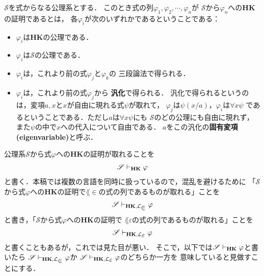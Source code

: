 	\begin{screen}
		\begin{metadfn}[{\bf HK}における証明]
			$\mathscr{S}$を式からなる公理系とする．
			このとき式の列$\varphi_{1},\varphi_{2},\cdots,\varphi_{n}$が
			$\mathscr{S}$から$\varphi_{n}$への{\bf HK}の証明であるとは，
			各$\varphi_{i}$が次のいずれかであるということである：
			\begin{itemize}
				\item $\varphi_{i}$は{\bf HK}の公理である．
				\item $\varphi_{i}$は$\mathscr{S}$の公理である．
				\item $\varphi_{i}$は，これより前の式$\varphi_{j}$と$\varphi_{k}$の
					三段論法で得られる．
				\item $\varphi_{i}$は，これより前の式$\varphi_{j}$から
					{\bf 汎化}で得られる．
					汎化で得られるというのは，変項$a,x$と$x$が自由に現れる式$\psi$が取れて，
					$\varphi_{j}$は$\psi(x/a)$，$\varphi_{i}$は$\forall x \psi$
					であるということである．ただし$a$は$\forall x \psi$にも
					$\mathscr{S}$のどの公理にも自由に現れず，
					また$\psi$の中で$x$への代入について自由である．
					$a$をこの汎化の{\bf 固有変項}
					{\bf (eigenvariable)}と呼ぶ．
			\end{itemize}
		\end{metadfn}
	\end{screen}
	
	公理系$\mathscr{S}$から式$\varphi$への{\bf HK}の証明が取れることを
	\begin{align}
		\mathscr{S} \vdash_{{\scriptsize \mbox{{\bf HK}}}} \varphi
	\end{align}
	と書く．本稿では複数の言語を同時に扱っているので，混乱を避けるために
	「$\mathscr{S}$から式$\varphi$への{\bf HK}の証明で$\lang{\in}$の式の列であるものが取れる」ことを
	\begin{align}
		\mathscr{S} \provable{\mbox{{\bf HK}},\lang{\in}} \varphi
	\end{align}
	と書き，「$\mathscr{S}$から式$\varphi$への{\bf HK}の証明で
	$\lang{\varepsilon}$の式の列であるものが取れる」ことを
	\begin{align}
		\mathscr{S} \provable{\mbox{{\bf HK}},\lang{\varepsilon}} \varphi
	\end{align}
	と書くこともあるが，これでは見た目が悪い．
	そこで，以下では$\mathscr{S} \vdash_{{\scriptsize \mbox{{\bf HK}}}} \varphi$と書いたら
	$\mathscr{S} \provable{\mbox{{\bf HK}},\lang{\in}} \varphi$か
	$\mathscr{S} \provable{\mbox{{\bf HK}},\lang{\varepsilon}} \varphi$のどちらか一方を
	意味していると見做すことにする．
	
